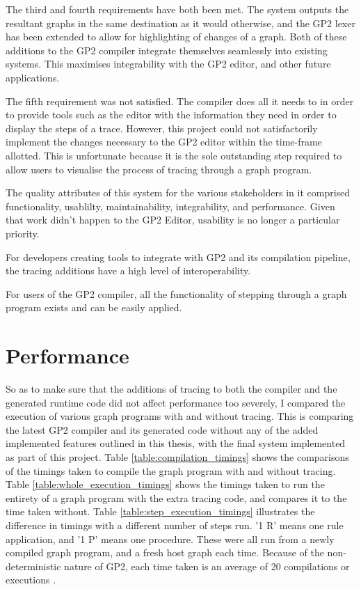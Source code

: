 \documentclass{UoYCSproject}
\begin{document}
The third and fourth requirements have both been met. The system outputs the resultant graphs in the same destination as it would otherwise, and the GP2 lexer has been extended to allow for highlighting of changes of a graph. Both of these additions to the GP2 compiler integrate themselves seamlessly into existing systems. This maximises integrability with the GP2 editor, and other future applications.

The fifth requirement was not satisfied. The compiler does all it needs to in order to provide tools such as the editor with the information they need in order to display the steps of a trace. However, this project could not satisfactorily implement the changes necessary to the GP2 editor within the time-frame allotted. This is unfortunate because it is the sole outstanding step required to allow users to visualise the process of tracing through a graph program.

The quality attributes of this system for the various stakeholders in it comprised functionality, usablilty, maintainability, integrability, and performance. Given that work didn't happen to the GP2 Editor, usability is no longer a particular priority.

For developers creating tools to integrate with GP2 and its compilation pipeline, the tracing additions have a high level of interoperability.

For users of the GP2 compiler, all the functionality of stepping through a graph program exists and can be easily applied.

\section{Performance}

So as to make sure that the additions of tracing to both the compiler and the generated runtime code did not affect performance too severely, I compared the execution of various graph programs with and without tracing. This is comparing the latest GP2 compiler and its generated code without any of the added implemented features outlined in this thesis, with the final system implemented as part of this project. Table \ref{table:compilation_timings} shows the comparisons of the timings taken to compile the graph program with and without tracing. Table \ref{table:whole_execution_timings} shows the timings taken to run the entirety of a graph program with the extra tracing code, and compares it to the time taken without. Table \ref{table:step_execution_timings} illustrates the difference in timings with a different number of steps run. '1 R' means one rule application, and '1 P' means one procedure. These were all run from a newly compiled graph program, and a fresh host graph each time. Because of the non-deterministic nature of GP2, each time taken is an average of 20 compilations or executions \cite{measuring_performance}.
\end{document}
